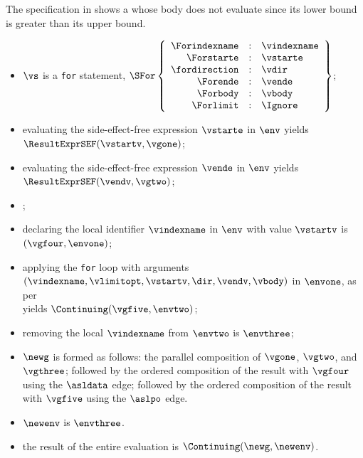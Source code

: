 The specification in  shows a \forstatementterm{}
whose body does not evaluate since its lower bound is greater than its upper bound.

\ProseParagraph
\AllApply
\begin{itemize}
  \item $\vs$ is a \texttt{for} statement, $\SFor\left\{\begin{array}{rcl}
    \Forindexname &:& \vindexname\\
    \Forstarte &:& \vstarte\\
    \fordirection &:& \vdir\\
    \Forende &:& \vende\\
    \Forbody &:& \vbody\\
    \Forlimit &:& \Ignore
  \end{array}\right\}$;
  \item evaluating the side-effect-free expression $\vstarte$ in $\env$ yields\\
        $\ResultExprSEF(\vstartv, \vgone)$\ProseOrDynErrorDiverging;
  \item evaluating the side-effect-free expression $\vende$ in $\env$ yields\\
        $\ResultExprSEF(\vendv, \vgtwo)$\ProseOrError;
  \item \Proseevallimit{$\env$}{$\velimitopt$}{$(\vlimitopt, \vgthree)$}\ProseOrDynErrorDiverging;
  \item declaring the local identifier $\vindexname$ in $\env$ with value $\vstartv$ is $(\vgfour, \envone)$;
  \item applying the \texttt{for} loop with arguments \\
        $(\vindexname, \vlimitopt, \vstartv, \dir, \vendv, \vbody)$ in $\envone$,
        as per \\
         yields $\Continuing(\vgfive, \envtwo)$\ProseReturningOrAbnormal;
  \item removing the local $\vindexname$ from $\envtwo$ is $\envthree$;
  \item $\newg$ is formed as follows:
        the parallel composition of $\vgone$, $\vgtwo$, and $\vgthree$;
        followed by the ordered composition of the result with $\vgfour$ using the $\asldata$ edge;
        followed by the ordered composition of the result with $\vgfive$ using the $\aslpo$ edge.
  \item $\newenv$ is $\envthree$.
  \item the result of the entire evaluation is $\Continuing(\newg, \newenv)$.
\end{itemize}

